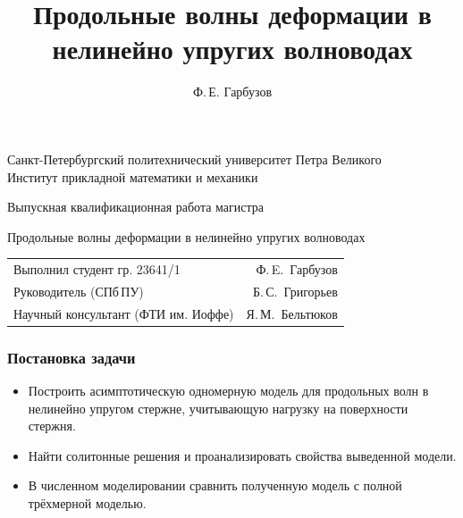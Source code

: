 \documentclass{beamer}
\title[Волны в нелинейно упругих телах]{Продольные волны деформации в нелинейно упругих волноводах}
\author[Ф.\,Е. Гарбузов]{Ф.\,Е. Гарбузов}
\begin{document}

\begin{frame}[plain]
\centering
{\footnotesize
Санкт-Петербургский политехнический университет Петра Великого\\
Институт прикладной математики и механики
}

\vspace{12mm}
Выпускная квалификационная работа магистра
\vspace{3mm}

{\Large\color{blue}
Продольные волны деформации в нелинейно упругих волноводах
}
\vspace{12mm}

{ \footnotesize 
\begin{tabularx}{.9\linewidth}{Xr}
	Выполнил студент гр. 23641/1 & Ф.\,E.~Гарбузов  
	\vspace{2mm}\\
	Руководитель (СПб\,ПУ) & Б.\,С.~Григорьев
	\vspace{2mm}\\
	Научный консультант (ФТИ им. Иоффе)  & Я.\,М.~Бельтюков
\end{tabularx} 
}
\end{frame}
 
\begin{frame}
\frametitle{Постановка задачи}
\begin{itemize}
	\item Построить асимптотическую одномерную модель для продольных волн в нелинейно упругом стержне, учитывающую нагрузку на поверхности стержня.
	\item Найти солитонные решения и проанализировать свойства выведенной модели.
	\item В численном моделировании сравнить полученную модель с полной трёхмерной моделью.
\end{itemize}
\end{frame}
\end{document}
